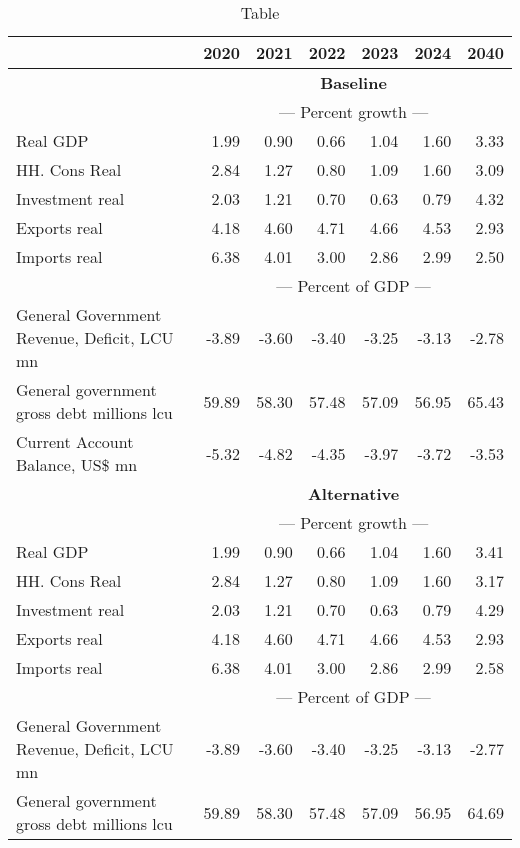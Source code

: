 \documentclass{article}
\begin{document}
\begin{table}[ht]
\caption{Table}
\begin{tabular}{lrrrrr|r}
\toprule
 & 2020 & 2021 & 2022 & 2023 & 2024 & 2040 \\
\midrule
&\multicolumn{6}{c}{{\large \textbf{Baseline}}}                               \\
&\multicolumn{6}{c}{{---  Percent growth ---}}                               \\
Real GDP & 1.99 & 0.90 & 0.66 & 1.04 & 1.60 & 3.33 \\
HH. Cons Real & 2.84 & 1.27 & 0.80 & 1.09 & 1.60 & 3.09 \\
Investment real & 2.03 & 1.21 & 0.70 & 0.63 & 0.79 & 4.32 \\
Exports real & 4.18 & 4.60 & 4.71 & 4.66 & 4.53 & 2.93 \\
Imports real & 6.38 & 4.01 & 3.00 & 2.86 & 2.99 & 2.50 \\
&\multicolumn{6}{c}{{---  Percent of GDP ---}}                               \\
General Government Revenue, Deficit, LCU mn & -3.89 & -3.60 & -3.40 & -3.25 & -3.13 & -2.78 \\
General government gross debt millions lcu & 59.89 & 58.30 & 57.48 & 57.09 & 56.95 & 65.43 \\
Current Account Balance, US\$ mn & -5.32 & -4.82 & -4.35 & -3.97 & -3.72 & -3.53 \\
&\multicolumn{6}{c}{{\large \textbf{Alternative}}}                               \\
&\multicolumn{6}{c}{{---  Percent growth ---}}                               \\
Real GDP & 1.99 & 0.90 & 0.66 & 1.04 & 1.60 & 3.41 \\
HH. Cons Real & 2.84 & 1.27 & 0.80 & 1.09 & 1.60 & 3.17 \\
Investment real & 2.03 & 1.21 & 0.70 & 0.63 & 0.79 & 4.29 \\
Exports real & 4.18 & 4.60 & 4.71 & 4.66 & 4.53 & 2.93 \\
Imports real & 6.38 & 4.01 & 3.00 & 2.86 & 2.99 & 2.58 \\
&\multicolumn{6}{c}{{---  Percent of GDP ---}}                               \\
General Government Revenue, Deficit, LCU mn & -3.89 & -3.60 & -3.40 & -3.25 & -3.13 & -2.77 \\
General government gross debt millions lcu & 59.89 & 58.30 & 57.48 & 57.09 & 56.95 & 64.69 \\

\end{tabular}
\end{table}
\end{document}
